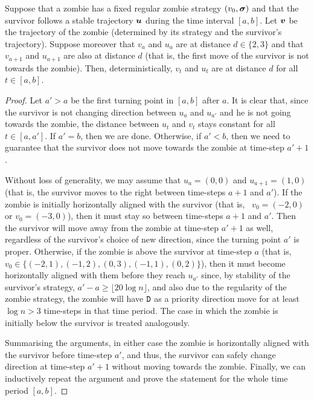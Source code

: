 \documentclass[12pt]{amsart}
\begin{document}
\begin{lemma}\label{lem:followtorus}
Suppose that a zombie has a fixed regular zombie strategy $(v_0,{\boldsymbol\sigma})$ and that the survivor follows a stable trajectory ${\boldsymbol u}$ during the time interval $[a,b]$. Let ${\boldsymbol v}$ be the trajectory of the
zombie (determined by its strategy and the survivor's trajectory). Suppose moreover that $v_a$ and $u_a$ are at distance $d\in\{2,3\}$ and that $v_{a+1}$ and $u_{a+1}$ are also at distance $d$ (that
is, the first move of the survivor is not towards the zombie). Then, deterministically, $v_t$ and $u_t$ are at distance $d$ for all $t\in[a,b]$.
\end{lemma}
\begin{proof}
Let $a'>a$ be the first turning point in $[a,b]$ after $a$. It is clear that, since the survivor is not changing direction between $u_a$ and $u_{a'}$ and he is not going towards the zombie, the
distance between $u_t$ and $v_t$ stays constant for all $t\in[a,a']$. If $a'=b$, then we are done. Otherwise, if $a'<b$, then we need to guarantee that the survivor does not move towards the zombie at time-step $a'+1$.

Without loss of generality, we may assume that $u_a=(0,0)$ and $u_{a+1}=(1,0)$ (that is, the survivor moves to the right between time-steps $a+1$ and $a'$). If the zombie is initially horizontally aligned with the survivor (that
is, ~$v_0=(-2,0)$ or $v_0=(-3,0)$), then it must stay so between time-steps $a+1$ and $a'$. Then the survivor will move away from the zombie at time-step $a'+1$ as well, regardless of the survivor's
choice of new direction, since the turning point $a'$ is proper. Otherwise, if the zombie is above the survivor at time-step $a$ (that is, $v_0 \in \{(-2,1), (-1,2), (0,3), (-1,1), (0,2)\}$),
then it must become horizontally aligned with them before they reach $u_{a'}$ since, by stability of the survivor's strategy, $a' - a \geq \lfloor 20\log n \rfloor$, and also due to the regularity of the zombie strategy, the zombie will have ${\mathtt D}$ as a priority direction move for at least
$\log n>3$ time-steps in that time period. The case in which the zombie is initially below the survivor is treated analogously. 

Summarising the arguments, in either case the zombie is horizontally
aligned with the survivor before time-step $a'$, and thus, the survivor can safely change direction at time-step $a'+1$ without moving towards the zombie. Finally, we can inductively repeat the argument and prove the statement for the whole time period $[a,b]$.
\end{proof}
\end{document}
